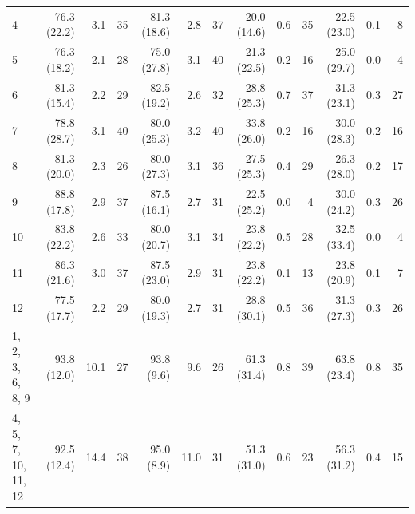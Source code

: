 \begin{table}[bt]
{\begin{tabular}{l|rrr|rrr|rrr|rrr}
        4 & 76.3 (22.2) & 3.1 & 35 &
        81.3 (18.6) & 2.8 & 37 &
        20.0 (14.6) & 0.6 & 35 &
        22.5 (23.0) & 0.1 & 8 \\
        
        5 & 76.3 (18.2) & 2.1 & 28 &
        75.0 (27.8) & 3.1 & 40 &
        21.3 (22.5) & 0.2 & 16 &
        25.0 (29.7) & 0.0 & 4 \\
        
        6 & 81.3 (15.4) & 2.2 & 29 &
        82.5 (19.2) & 2.6 & 32 &
        28.8 (25.3) & 0.7 & 37 &
        31.3 (23.1) & 0.3 & 27 \\
        
        7 & 78.8 (28.7) & 3.1 & 40 &
        80.0 (25.3) & 3.2 & 40 &
        33.8 (26.0) & 0.2 & 16 &
        30.0 (28.3) & 0.2 & 16 \\
        
        8 & 81.3 (20.0) & 2.3 & 26 &
        80.0 (27.3) & 3.1 & 36 &
        27.5 (25.3) & 0.4 & 29 &
        26.3 (28.0) & 0.2 & 17 \\
        
        9 & 88.8 (17.8) & 2.9 & 37 &
        87.5 (16.1) & 2.7 & 31 &
        22.5 (25.2) & 0.0 & 4 &
        30.0 (24.2) & 0.3 & 26 \\
        
        10 & 83.8 (22.2) & 2.6 & 33 &
        80.0 (20.7) & 3.1 & 34 &
        23.8 (22.2) & 0.5 & 28 &
        32.5 (33.4) & 0.0 & 4 \\
        
        11 & 86.3 (21.6) & 3.0 & 37 &
        87.5 (23.0) & 2.9 & 31 &
        23.8 (22.2) & 0.1 & 13 &
        23.8 (20.9) & 0.1 & 7 \\
        
        12 & 77.5 (17.7) & 2.2 & 29 &
        80.0 (19.3) & 2.7 & 31 &
        28.8 (30.1) & 0.5 & 36 &
        31.3 (27.3) & 0.3 & 26 \\
        
        1, 2, 3, 6, 8, 9 & \cellcolor{highlightcolor} 93.8 (12.0) & 10.1 & 27 &
        93.8 (9.6) & 9.6 & 26 &
        61.3 (31.4) & 0.8 & 39 &
        \cellcolor{highlightcolor} 63.8 (23.4) & 0.8 & 35 \\
        
        4, 5, 7, 10, 11, 12 & 92.5 (12.4) & 14.4 & 38 &
        \cellcolor{highlightcolor} 95.0 (8.9) & 11.0 & 31 &
        51.3 (31.0) & 0.6 & 23 &
        56.3 (31.2) & 0.4 & 15 \\
        

\end{tabular}}
\end{table}

